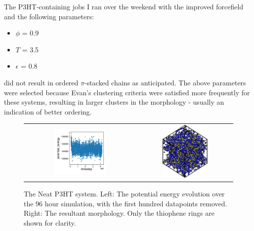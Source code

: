 \documentclass[12pt]{article}
\begin{document}
The P3HT-containing jobs I ran over the weekend with the improved forcefield and the following parameters:
\begin{itemize}
    \item{$\phi$ = 0.9}
    \item{$T$ = 3.5}
    \item{$\epsilon$ = 0.8}
\end{itemize}
did not result in ordered $\pi$-stacked chains as anticipated.
The above parameters were selected because Evan's clustering criteria were satisfied more frequently for these systems, resulting in larger clusters in the morphology - usually an indication of better ordering.


\begin{figure}[h!]\centering
    \begin{tabular}{cc}
        \includegraphics[width=0.5\textwidth]{Figures/P3HTPE.pdf}&
	    \includegraphics[width=0.5\textwidth]{Figures/P3HTMorph.png}
    \end{tabular}
    \caption{The Neat P3HT system. Left: The potential energy evolution over the 96 hour simulation, with the first hundred datapoints removed. Right: The resultant morphology. Only the thiophene rings are shown for clarity.}
	\label{fig:P3HTPE}
\end{figure}
\end{document}

